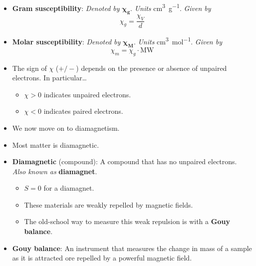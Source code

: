 \documentclass[../notes.tex]{subfiles}
\begin{document}
\begin{itemize}
    \item \textbf{Gram susceptibility}: \emph{Denoted by} $\bm{\chi_g}$. \emph{Units} \si{\cubic\centi\meter\per\gram}. \emph{Given by}
    \begin{equation*}
        \chi_g = \frac{\chi_V}{d}
    \end{equation*}
    \item \textbf{Molar susceptibility}: \emph{Denoted by} $\bm{\chi_M}$. \emph{Units} \si{\cubic\centi\meter\per\mole}. \emph{Given by}
    \begin{equation*}
        \chi_m = \chi_g\cdot\text{MW}
    \end{equation*}
    \item The sign of $\chi$ ($+/-$) depends on the presence or absence of unpaired electrons. In particular\dots
    \begin{itemize}
        \item $\chi>0$ indicates unpaired electrons.
        \item $\chi<0$ indicates paired electrons.
    \end{itemize}
    \item We now move on to diamagnetism.
    \item Most matter is diamagnetic.
    \item \textbf{Diamagnetic} (compound): A compound that has no unpaired electrons. \emph{Also known as} \textbf{diamagnet}.
    \begin{itemize}
        \item $S=0$ for a diamagnet.
        \item These materials are weakly repelled by magnetic fields.
        \item The old-school way to measure this weak repulsion is with a \textbf{Gouy balance}.
    \end{itemize}
    \item \textbf{Gouy balance}: An instrument that measures the change in mass of a sample as it is attracted ore repelled by a powerful magnetic field.
    \begin{figure}[h!]
        \centering
\end{figure}
\end{itemize}
\end{document}
